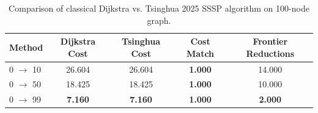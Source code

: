 \begin{table}[t]
\centering
\caption{Comparison of classical Dijkstra vs. Tsinghua 2025 SSSP algorithm on 100-node graph.}
\label{tab:routing}
\begin{tabular}{lcccc}
\toprule
Method & Dijkstra Cost & Tsinghua Cost & Cost Match & Frontier Reductions \\
\midrule
0 $\rightarrow$ 10 & 26.604 & 26.604 & \textbf{1.000} & 14.000 \\
0 $\rightarrow$ 50 & 18.425 & 18.425 & \textbf{1.000} & 10.000 \\
0 $\rightarrow$ 99 & \textbf{7.160} & \textbf{7.160} & \textbf{1.000} & \textbf{2.000} \\
\bottomrule
\end{tabular}
\end{table}
